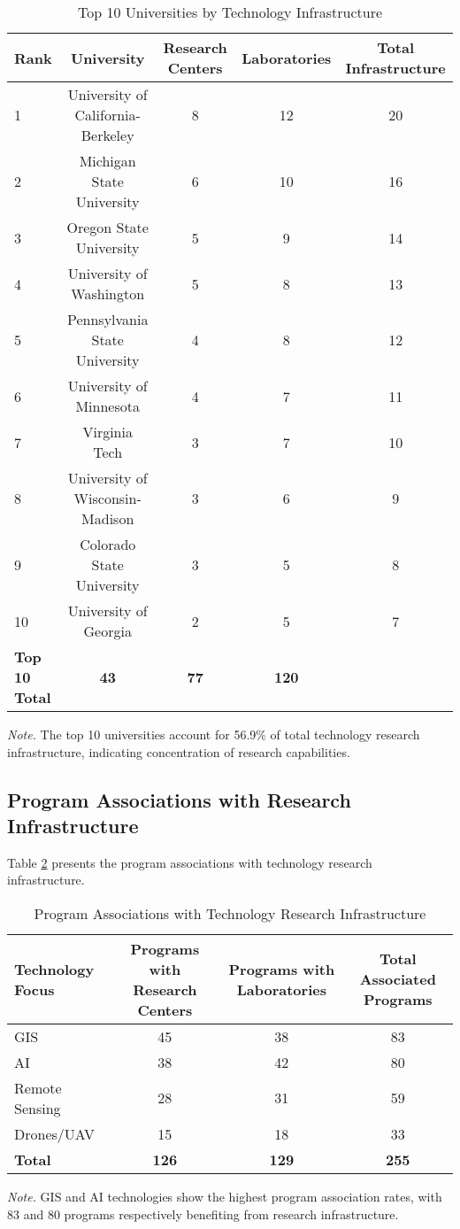 \documentclass[12pt]{article}
\begin{document}
\begin{table}[H]
\centering
\caption{Top 10 Universities by Technology Infrastructure}
\label{tab:university_infrastructure_rankings}
\begin{tabular}{lcccc}
\toprule
\textbf{Rank} & \textbf{University} & \textbf{Research Centers} & \textbf{Laboratories} & \textbf{Total Infrastructure} \\
\midrule
1 & University of California-Berkeley & 8 & 12 & 20 \\
2 & Michigan State University & 6 & 10 & 16 \\
3 & Oregon State University & 5 & 9 & 14 \\
4 & University of Washington & 5 & 8 & 13 \\
5 & Pennsylvania State University & 4 & 8 & 12 \\
6 & University of Minnesota & 4 & 7 & 11 \\
7 & Virginia Tech & 3 & 7 & 10 \\
8 & University of Wisconsin-Madison & 3 & 6 & 9 \\
9 & Colorado State University & 3 & 5 & 8 \\
10 & University of Georgia & 2 & 5 & 7 \\
\midrule
\textbf{Top 10 Total} & \textbf{43} & \textbf{77} & \textbf{120} \\
\bottomrule
\end{tabular}
\small
\textit{Note.} The top 10 universities account for 56.9\% of total technology research infrastructure, indicating concentration of research capabilities.
\end{table}

\subsection{Program Associations with Research Infrastructure}
Table \ref{tab:program_associations} presents the program associations with technology research infrastructure.

\begin{table}[H]
\centering
\caption{Program Associations with Technology Research Infrastructure}
\label{tab:program_associations}
\begin{tabular}{lccc}
\toprule
\textbf{Technology Focus} & \textbf{Programs with Research Centers} & \textbf{Programs with Laboratories} & \textbf{Total Associated Programs} \\
\midrule
GIS & 45 & 38 & 83 \\
AI & 38 & 42 & 80 \\
Remote Sensing & 28 & 31 & 59 \\
Drones/UAV & 15 & 18 & 33 \\
\midrule
\textbf{Total} & \textbf{126} & \textbf{129} & \textbf{255} \\
\bottomrule
\end{tabular}
\small
\textit{Note.} GIS and AI technologies show the highest program association rates, with 83 and 80 programs respectively benefiting from research infrastructure.
\end{table}
\end{document}
